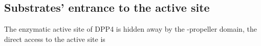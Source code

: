 \subsection{Substrates' entrance to the active site}

The enzymatic active site of DPP4 is hidden away by the \beta-propeller domain, the direct access to the active site is 